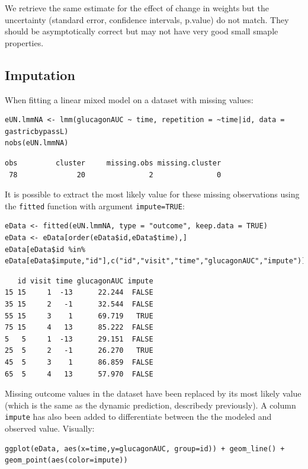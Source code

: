 \documentclass[12pt]{article}
\begin{document}
We retrieve the same estimate for the effect of change in weights but
the uncertainty (standard error, confidence intervals, p.value) do not
match. They should be asymptotically correct but may not have very
good small smaple properties.

\subsection{Imputation}
\label{imputation}
When fitting a linear mixed model on a dataset with missing values:
\lstset{language=r,label= ,caption= ,captionpos=b,numbers=none}
\begin{lstlisting}
eUN.lmmNA <- lmm(glucagonAUC ~ time, repetition = ~time|id, data = gastricbypassL)
nobs(eUN.lmmNA)
\end{lstlisting}

\begin{verbatim}
obs         cluster     missing.obs missing.cluster 
 78              20               2               0
\end{verbatim}


It is possible to extract the most likely value for these missing
observations using the \texttt{fitted} function with argument \texttt{impute=TRUE}:
\lstset{language=r,label= ,caption= ,captionpos=b,numbers=none}
\begin{lstlisting}
eData <- fitted(eUN.lmmNA, type = "outcome", keep.data = TRUE)
eData <- eData[order(eData$id,eData$time),]
eData[eData$id %in% eData[eData$impute,"id"],c("id","visit","time","glucagonAUC","impute")]
\end{lstlisting}

\begin{verbatim}
   id visit time glucagonAUC impute
15 15     1  -13      22.244  FALSE
35 15     2   -1      32.544  FALSE
55 15     3    1      69.719   TRUE
75 15     4   13      85.222  FALSE
5   5     1  -13      29.151  FALSE
25  5     2   -1      26.270   TRUE
45  5     3    1      86.859  FALSE
65  5     4   13      57.970  FALSE
\end{verbatim}


Missing outcome values in the dataset have been replaced by its most
likely value (which is the same as the dynamic prediction, describedy
previously). A column \texttt{impute} has also been added to differentiate
between the the modeled and observed value. Visually:
\lstset{language=r,label= ,caption= ,captionpos=b,numbers=none}
\begin{lstlisting}
ggplot(eData, aes(x=time,y=glucagonAUC, group=id)) + geom_line() + geom_point(aes(color=impute))
\end{lstlisting}
\end{document}
